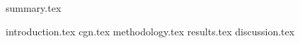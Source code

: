 {summary.tex}
\newpage


{introduction.tex}
{cgn.tex}
{methodology.tex}
{results.tex}
{discussion.tex}













